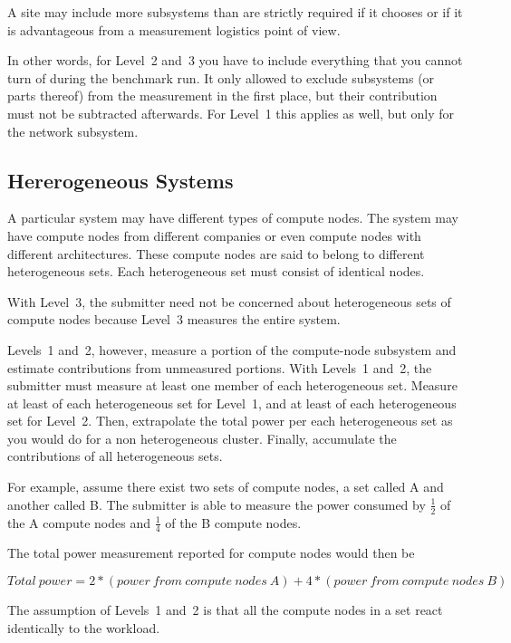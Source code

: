 \noindent
A site may include more subsystems than are strictly required if it chooses or if it is advantageous from a measurement logistics point of view.
\wl

\noindent
In other words, for Level~2 and~3 you have to include everything that you cannot turn of during the benchmark run.
It only allowed to exclude subsystems (or parts thereof) from the measurement in the first place, but their contribution must not be subtracted afterwards.
For Level~1 this applies as well, but only for the network subsystem.
\wl

\subsection{Hererogeneous Systems}

\noindent
A particular system may have different types of compute nodes.
The system may have compute nodes from different companies or even compute nodes with different architectures.
These compute nodes are said to belong to different heterogeneous sets.
Each heterogeneous set must consist of identical nodes.
\wl

\noindent
With Level~3, the submitter need not be concerned about heterogeneous sets of compute nodes because Level~3 measures the entire system.
\wl

\noindent
Levels~1 and~2, however, measure a portion of the compute-node subsystem and estimate contributions from unmeasured portions.
With Levels~1 and~2, the submitter must measure at least one member of each heterogeneous set.
Measure at least \SpecFracMinLOne{} of each heterogeneous set for Level~1, and at least \SpecFracMinLTwo{} of each heterogeneous set for Level~2.
Then, extrapolate the total power per each heterogeneous set as you would do for a non heterogeneous cluster.
Finally, accumulate the contributions of all heterogeneous sets.
\wl

\noindent
For example, assume there exist two sets of compute nodes, a set called A and another called B.
The submitter is able to measure the power 
consumed by $ \frac{1}{2} $ of the A compute nodes and $\frac{1}{4}$ of the B compute nodes.
\wl

\noindent
The total power measurement reported for compute nodes would then be 

\noindent
\[ Total~power=2*(power~from~compute~nodes~A) + 4*(power~from~compute~nodes~B) \]

\noindent
The assumption of Levels~1 and~2 is that all the compute nodes in a set react identically to the workload.



